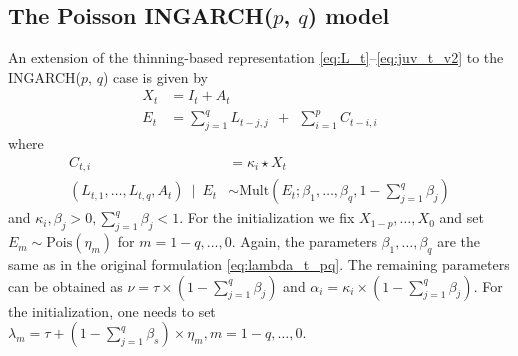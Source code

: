 \documentclass{article}
\begin{document}
\subsection{The Poisson INGARCH($p$, $q$) model}
\label{subsec:poissonpq}

An extension of the thinning-based representation \eqref{eq:L_t}--\eqref{eq:juv_t_v2} to the INGARCH($p$, $q$) case is given by
\begin{align}
X_t & = I_t + A_t \label{eq:Xt_thinning_pq}\\
E_t & = \sum_{j = 1}^q L_{t - j, j} \ \ + \ \ \sum_{i = 1}^p C_{t - i, i}
\end{align}
where
\begin{align}
C_{t, i} & = \kappa_i \star X_t\\
(L_{t, 1}, \dots, L_{t, q}, A_t) \ \mid \ E_t & \sim \text{Mult}\left(E_t; \beta_1, \dots, \beta_q, 1 - \sum_{j = 1}^q \beta_j\right)\label{eq:L_t_mult}
\end{align}
and $\kappa_i, \beta_j > 0, \sum_{j = 1}^q \beta_j < 1$. For the initialization we fix $X_{1 - p}, \dots, X_0$ and set $E_{m} \sim \text{Pois}(\eta_m)$ for $m = 1 - q, \dots, 0$. Again, the parameters $\beta_{1}, \dots, \beta_q$ are the same as in the original formulation \eqref{eq:lambda_t_pq}. The remaining parameters can be obtained as $\nu = \tau \times \left(1 - \sum_{j = 1}^q\beta_j \right)$ and $\alpha_i = \kappa_i \times \left(1 - \sum_{j = 1}^q\beta_j \right)$. For the initialization, one needs to set $\lambda_m = \tau + (1 - \sum_{j = 1}^q\beta_s) \times \eta_m, m = 1 - q, \dots, 0$.
\end{document}
